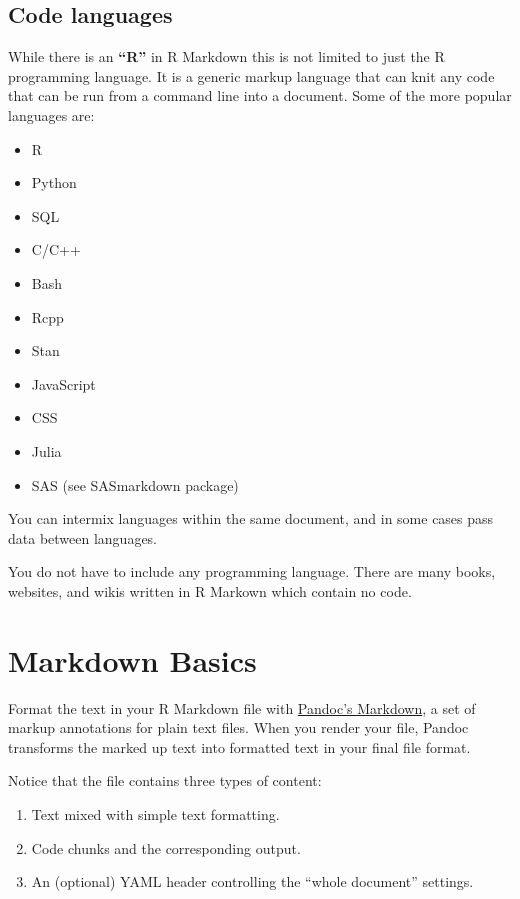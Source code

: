 \documentclass[]{book}
\providecommand{\tightlist}{%
  \setlength{\itemsep}{0pt}\setlength{\parskip}{0pt}}
\let\BeginKnitrBlock\begin \let\EndKnitrBlock\end
\begin{document}
\subsection{Code languages}\label{code-languages}

While there is an \textbf{``R''} in R Markdown this is not limited to
just the R programming language. It is a generic markup language that
can knit any code that can be run from a command line into a document.
Some of the more popular languages are:

\begin{itemize}
\tightlist
\item
  R
\item
  Python
\item
  SQL
\item
  C/C++
\item
  Bash
\item
  Rcpp
\item
  Stan
\item
  JavaScript
\item
  CSS
\item
  Julia
\item
  SAS (see SASmarkdown package)
\end{itemize}

You can intermix languages within the same document, and in some cases
pass data between languages.

\BeginKnitrBlock{rmdimportant}
You do not have to include any programming language. There are many
books, websites, and wikis written in R Markown which contain no code.
\EndKnitrBlock{rmdimportant}

\section{Markdown Basics}\label{markdown-basics}

Format the text in your R Markdown file with
\href{https://pandoc.org/MANUAL.html\#pandocs-markdown}{Pandoc's
Markdown}, a set of markup annotations for plain text files. When you
render your file, Pandoc transforms the marked up text into formatted
text in your final file format.

Notice that the file contains three types of content:

\begin{enumerate}
\def\labelenumi{\arabic{enumi}.}
\tightlist
\item
  Text mixed with simple text formatting.
\item
  Code chunks and the corresponding output.
\item
  An (optional) YAML header controlling the ``whole document'' settings.
\end{enumerate}
\end{document}
